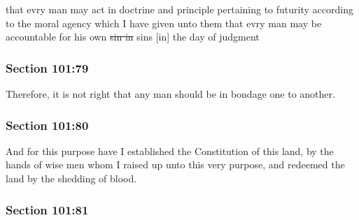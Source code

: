 		\begin{framed}
		\scriptsize
			\begin{compactdesc}
				\item[JSP] that evry man may act in doctrine and principle pertaining to futurity according to the moral agency which I have given unto them that evry man may be accountable for his own \sout{sin in} sins [in] the day of judgment
			\end{compactdesc}
		\end{framed}

	\subsubsection{Section 101:79} %
		\label{DC101-79}

		Therefore, it is not right that any man should be in bondage one to another.


	\subsubsection{Section 101:80} %
		\label{DC101-80}

		And for this purpose have I established the Constitution of this land, by the hands of wise men whom I raised up unto this very purpose, and redeemed the land by the shedding of blood.


	\subsubsection{Section 101:81} %
		\label{DC101-81}

